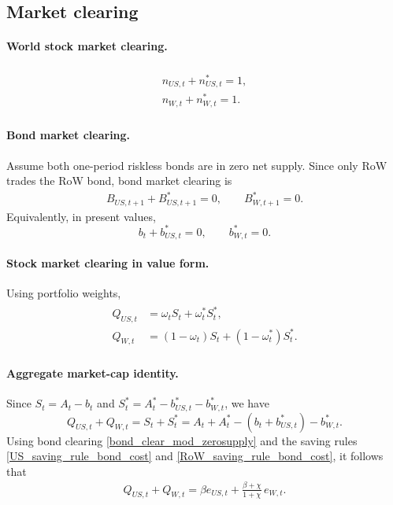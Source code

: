 \documentclass[12pt]{article}
\theoremstyle{plain}
\begin{document}
\subsection{Market clearing}

\paragraph{World stock market clearing.}
\begin{align}\label{stock_clear_mod}
\begin{split}
n_{US,t}+n^*_{US,t}=1,\\
n_{W,t}+n^*_{W,t}=1.
\end{split}
\end{align}

\paragraph{Bond market clearing.}
Assume both one-period riskless bonds are in zero net supply. Since only RoW trades the RoW bond, bond market
clearing is
\begin{align}\label{bond_clear_mod_zerosupply}
B_{US,t+1}+B^*_{US,t+1}=0,
\qquad
B^*_{W,t+1}=0.
\end{align}
Equivalently, in present values,
\[
b_t+b_{US,t}^*=0,
\qquad
b_{W,t}^*=0.
\]

\paragraph{Stock market clearing in value form.}
Using portfolio weights,
\begin{align}\label{stock_weight_clear_mod}
\begin{split}
Q_{US,t} &= \omega_t S_t + \omega_t^* S_t^*,\\
Q_{W,t}  &= (1-\omega_t) S_t + (1-\omega_t^*) S_t^* .
\end{split}
\end{align}

\paragraph{Aggregate market-cap identity.}
Since $S_t=A_t-b_t$ and $S_t^*=A_t^*-b_{US,t}^*-b_{W,t}^*$, we have
\[
Q_{US,t}+Q_{W,t}=S_t+S_t^*=A_t+A_t^*-(b_t+b_{US,t}^*)-b_{W,t}^*.
\]
Using bond clearing \eqref{bond_clear_mod_zerosupply} and the saving rules
\eqref{US_saving_rule_bond_cost} and \eqref{RoW_saving_rule_bond_cost}, it follows that
\begin{align}\label{Qsum_identity_mod_zerosupply}
\boxed{
Q_{US,t}+Q_{W,t}
=
\beta e_{US,t}
+\frac{\beta+\chi}{1+\chi}\,e_{W,t}.
}
\end{align}
\end{document}
